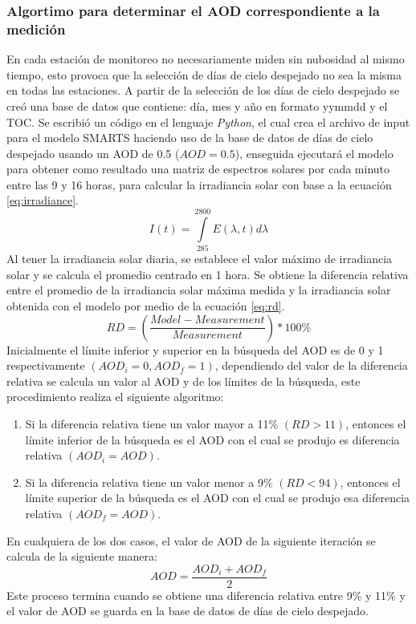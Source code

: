 \subsubsection{Algortimo para determinar el AOD correspondiente a la medición}
En cada estación de monitoreo no necesariamente miden sin nubosidad al mismo tiempo, esto provoca que la selección de días de cielo despejado no sea la misma en todas las estaciones. A partir de la selección de los días de cielo despejado se creó una base de datos que contiene: día, mes y año en formato yymmdd y el TOC. Se escribió un código en el lenguaje \textit{Python}, el cual crea el archivo de input para el modelo SMARTS haciendo uso de la base de datos de días de cielo despejado usando un AOD de 0.5 ($AOD=0.5$), enseguida ejecutará el modelo para obtener como resultado una matriz de espectros solares por cada minuto entre las 9 y 16 horas, para calcular la irradiancia solar con base a la ecuación \ref{eq:irradiance}.
\begin{equation}
    I(t) = \int\limits_{285}^{2800} E(\lambda,t) d\lambda
    \label{eq:irradiance}
\end{equation}
Al tener la irradiancia solar diaria, se establece el valor máximo de irradiancia solar y se calcula el promedio centrado en 1 hora. Se obtiene la diferencia relativa entre el promedio de la irradiancia solar máxima medida y la irradiancia solar obtenida con el modelo por medio de la ecuación \ref{eq:rd}.
\begin{equation}
    RD = \left(\frac{Model-Measurement}{Measurement}\right)*100\%
    \label{eq:rd}
\end{equation}
Inicialmente el límite inferior y superior en la búsqueda del AOD es de 0 y 1 respectivamente $(AOD_i=0, AOD_f=1)$, dependiendo del valor de la diferencia relativa se calcula un valor al AOD y de los límites de la búsqueda, este procedimiento realiza el siguiente algoritmo:
\begin{enumerate}
    \item Si la diferencia relativa tiene un valor mayor a 11\% $(RD>11)$, entonces el límite inferior de la búsqueda es el AOD con el cual se produjo es diferencia relativa $(AOD_i=AOD)$.
    \item Si la diferencia relativa tiene un valor menor a 9\% $(RD<94)$, entonces el límite superior de la búsqueda es el AOD con el cual se produjo esa diferencia relativa $(AOD_f=AOD)$.
\end{enumerate}
En cualquiera de los dos casos, el valor de AOD de la siguiente iteración se calcula de la siguiente manera:
\begin{equation*}
    AOD=\frac{AOD_i+AOD_f}{2}
\end{equation*}
Este proceso termina cuando se obtiene una diferencia relativa entre 9\% y 11\% y el valor de AOD se guarda en la base de datos de días de cielo despejado.
